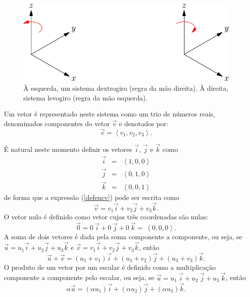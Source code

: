 \begin{figure}\begin{center}
 \includegraphics{./cap_algvet/figs/eixos_levo_destro}
      \caption{À esquerda, um sistema dextrogiro (regra da mão direita). À direita, sistema levogiro (regra da mão esquerda).}
      \label{fig:marginfig}
  \end{center}
  \end{figure}
 
 Um vetor é representado neste sistema como um trio de números reais, denominados componentes do vetor $\vec{v}$ e denotados por: 
\begin{equation}\label{defeucv}\vec{v}=\left<v_1,v_2,v_3\right>.\end{equation}
  
É natural neste momento definir os vetores $\vec{i}$, $\vec{j}$ e $\vec{k}$ como
\begin{equation}\label{defijk}
\begin{array}{rcl}
\vec{i}&=&\left<1,0,0\right>\\
\vec{j}&=&\left<0,1,0\right>\\
\vec{k}&=&\left<0,0,1\right>
\end{array}
\end{equation}
de forma que a expressão (\ref{defeucv}) pode ser escrita como
\begin{equation}\label{repijk}\vec{v}=v_1  \vec{i}+v_2  \vec{j}+v_3 \vec{k}.\end{equation}
O vetor nulo é definido como vetor cujas três coordenadas são nulas:
\begin{equation}\label{defnulo}\vec{0}=0 ~\! \vec{i}+0~\!  \vec{j}+0~\!  \vec{k}= ~\!\left<0,0,0\right>.\end{equation}
A soma de dois vetores é dada pela soma componente a componente, ou seja, se $\vec{u}=u_1  \vec{i}+u_2\vec{j}+u_3 \vec{k}$ e $\vec{v}=v_1\vec{i}+v_2\vec{j}+v_3 \vec{k}$, então
\begin{equation}\label{defsoma}\vec{u}+\vec{v}= \left(u_1+v_1\right) \vec{i}+\left(u_2+v_2\right) \vec{j}+\left(u_3+v_3\right) \vec{k}.\end{equation}
O produto de um vetor por um escalar é definido como a multiplicação componente a componente pelo escalar, ou seja, se $\vec{u}=u_1~\!  \vec{i}+u_2~\!  \vec{j}+u_3 ~\! \vec{k}$, então
\begin{equation}\label{defprod}\alpha\vec{u}=(\alpha u_1)\vec{i}+(\alpha u_2)\vec{j}+(\alpha u_3) \vec{k} .\end{equation}


